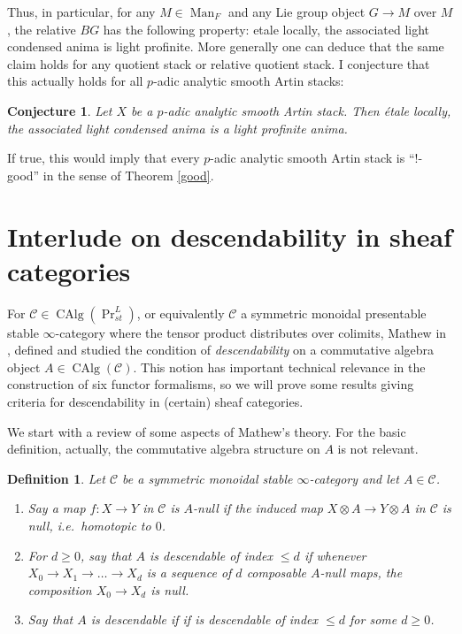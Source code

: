 \documentclass[12pt]{article}
\newtheorem{definition}[theorem]{Definition}
\newtheorem{conjecture}[theorem]{Conjecture}
\newcommand{\on}{\operatorname}
\begin{document}
Thus, in particular, for any $M\in\on{Man}_F$ and any Lie group object $G\to M$ over $M$, the relative $BG$ has the following property: etale locally, the associated light condensed anima is light profinite.  More generally one can deduce that the same claim holds for any quotient stack or relative quotient stack.  I conjecture that this actually holds for all $p$-adic analytic smooth Artin stacks:

\begin{conjecture}
Let $X$ be a $p$-adic analytic smooth Artin stack.  Then étale locally, the associated light condensed anima is a light profinite anima.
\end{conjecture}

If true, this would imply that every $p$-adic analytic smooth Artin stack is ``$!$-good'' in the sense of Theorem \ref{good}.

\section{Interlude on descendability in sheaf categories}\label{descsec}

For $\mathcal{C}\in\on{CAlg}(\on{Pr}_{st}^L)$, or equivalently $\mathcal{C}$ a symmetric monoidal presentable stable $\infty$-category where the tensor product distributes over colimits, Mathew in \cite{MathewGalois}, \cite{MathewDescent} defined and studied the condition of \emph{descendability} on a commutative algebra object $A\in\on{CAlg}(\mathcal{C})$.  This notion has important technical relevance in the construction of six functor formalisms, so we will prove some results giving criteria for descendability in (certain) sheaf categories.

We start with a review of some aspects of Mathew's theory.  For the basic definition, actually, the commutative algebra structure on $A$ is not relevant.

\begin{definition}
Let $\mathcal{C}$ be a symmetric monoidal stable $\infty$-category and let $A\in \mathcal{C}$.
\begin{enumerate}
\item Say a map $f:X\to Y$ in $\mathcal{C}$ is \emph{$A$-null} if the induced map $X\otimes A \to Y \otimes A$ in $\mathcal{C}$ is null, i.e.\ homotopic to $0$.
\item For $d\geq 0$, say that $A$ is \emph{descendable of index $\leq d$} if whenever $X_0\to X_1\to\ldots \to X_d$ is a sequence of $d$ composable $A$-null maps, the composition $X_0\to X_d$ is null.
\item Say that $A$ is descendable if if is descendable of index $\leq d$ for some $d\geq 0$.
\end{enumerate}
\end{definition}
\end{document}
